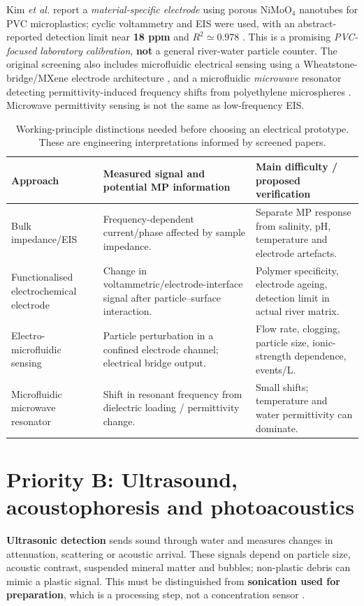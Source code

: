 \documentclass[10pt,a4paper]{article}
\begin{document}
Kim \emph{et al.} report a \emph{material-specific electrode} using porous NiMoO$_4$ nanotubes for PVC microplastics; cyclic voltammetry and EIS were used, with an abstract-reported detection limit near \textbf{18 ppm} and $R^2\simeq0.978$ \cite{Kim2024}. This is a promising \emph{PVC-focused laboratory calibration}, \textbf{not} a general river-water particle counter. The original screening also includes microfluidic electrical sensing using a Wheatstone-bridge/MXene electrode architecture \cite{MXene2025}, and a microfluidic \emph{microwave} resonator detecting permittivity-induced frequency shifts from polyethylene microspheres \cite{Microwave2025}. Microwave permittivity sensing is not the same as low-frequency EIS.

\begin{table}[H]\centering\footnotesize
\caption{Working-principle distinctions needed before choosing an electrical prototype. These are engineering interpretations informed by screened papers.}\label{tab:electrical}
\begin{tabularx}{\linewidth}{@{}p{2.4cm}X X@{}}\toprule
Approach & Measured signal and potential MP information & Main difficulty / proposed verification \\\midrule
Bulk impedance/EIS \cite{Blevins2021} & Frequency-dependent current/phase affected by sample impedance. & Separate MP response from salinity, pH, temperature and electrode artefacts. \\
Functionalised electrochemical electrode \cite{Kim2024} & Change in voltammetric/electrode-interface signal after particle--surface interaction. & Polymer specificity, electrode ageing, detection limit in actual river matrix. \\
Electro-microfluidic sensing \cite{MXene2025} & Particle perturbation in a confined electrode channel; electrical bridge output. & Flow rate, clogging, particle size, ionic-strength dependence, events/L. \\
Microfluidic microwave resonator \cite{Microwave2025} & Shift in resonant frequency from dielectric loading / permittivity change. & Small shifts; temperature and water permittivity can dominate. \\
\bottomrule\end{tabularx}
\end{table}

\section{Priority B: Ultrasound, acoustophoresis and photoacoustics}
\textbf{Ultrasonic detection} sends sound through water and measures changes in attenuation, scattering or acoustic arrival. These signals depend on particle size, acoustic contrast, suspended mineral matter and bubbles; non-plastic debris can mimic a plastic signal. This must be distinguished from \textbf{sonication used for preparation}, which is a processing step, not a concentration sensor \cite{Blevins2021}.
\end{document}

